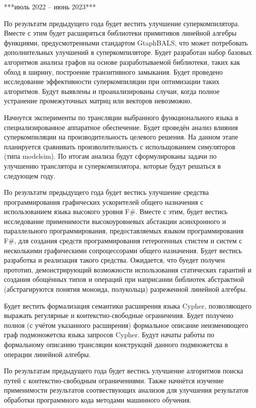 \documentclass[12pt]{article}  %
\theoremstyle{remark}
\begin{document}
***июль 2022 -- июнь 2023***

По результатм предыдущего года будет вестить улучшение суперкомпилятора. Вместе с этим будет расширяться библиотеки примитивов линейной алгебры функциями, предусмотренными стандартом GtaphBALS, что может потребовать дополнительных улучшений в суперкомпиляторе. Будет разработан набор базовых алгоритмов анализа графов на основе разработываемой библиотеки, таких как обход в ширину, построение транзитивного замыкания. Будет проведено исследование эффективности суперкомпиляции при оптимизации таких алгоритмов. Будут выявлены и проанализированы случаи, когда полное устранение промежуточных матриц или векторов невозможно.

Начнутся эксперименты по трансляции выбранного функционального языка в специализированное аппаратное обеспечение. Будет проведён анализ влияния суперкомпиляции на производительность целевого решения. На данном этапе планируется сравнивать произволительность с испольщованием симуляторов (типа modelsim). По итогам анализа будут сформулированы задачи по улучшению транслятора и суперкомпилятора, которые будут решаться в следующем году. 

По результатм предыдущего года будет вестись улучшение средства программирования графических ускорителей общего назначения с использованием языка высокого уровня F\#. Вместе с этим, будет вестись исследование применимости высокоуровневых абстакции асинхронного и параллельного программирования, предоставляемых языком программирования F\#, для создания средств программирования гетерогенных стистем и систем с несколькими графическими сопроцессорами общего назначения. Будет вестись разработка и реализация такого средства. Ожидается, что буедет получен прототип, демонстрирующий возможности использования статических гарантий и создания обощённых типов и операций при наприсании библиотек абстрактной (абстрагируются понятия моноида, полукольца) разреженной линейной алгебры.

Будет вестить формализация семантики расширения языка Cypher, позволяющего выражать регулярные и контекстно-свободные ограничения. Будет получено полноя (с учётом указанного расширения) формальное описание неизменяющего граф подмоножетсва языка запросов Cypher. Будут начаты работы по формальному описанию трансляции конструкций данного подмножетсва в операции линейной алгебры.

По результатам предыдущего года будет вестись улучшение алгоритмов поиска путей с контекстно-свободным ограничениями. Также начнётся изучение применимости результатов соотвествующих анализов для улучшения результатов обработки программного кода методами машинного обучения.
\end{document}
